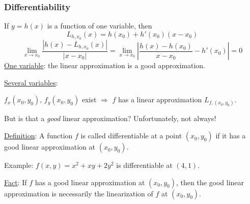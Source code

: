 \begin{frame}
  \frametitle{Differentiability}

If $y=h(x)$ is a function of one variable, then
%
$$L_{h,x_0}(x) = h(x_0) + h'(x_0) (x-x_0)$$
%
$$
  \lim_{x\to x_0} \frac{|h(x)-L_{h,x_0}(x)|}{|x-x_0|} = \lim_{x \to x_0} \left| \frac{h(x)-h(x_0)}{x-x_0} -h'(x_0) \right| = 0
$$
%
\pause \underline{One variable}: the linear approximation is a good approximation.

\pause \underline{Several variables}:

$f_x(x_0,y_0)$, $f_y(x_0,y_0)$ exist $\Longrightarrow$
$f$ has a linear approximation $L_{f, (x_0,y_0)}$.

But is that a \emph{good} linear approximation? \pause
Unfortunately, \textcolor[rgb]{0.98,0.00,0.00}{not always}!

\medskip

\pause \underline{Definition}: A function $f$ is called \alert<0->{differentiable at a point} $(x_0,y_0)$ if it has a good linear approximation at $(x_0,y_0)$.

\medskip

\pause Example: $f(x,y) = x^2+xy+2y^2$ is differentiable at $(4,1)$.

\medskip

\pause \underline{Fact}: If $f$ has a good linear approximation at $(x_0,y_0)$, then the good linear approximation is necessarily the linearization of $f$ at $(x_0,y_0)$.
\end{frame}